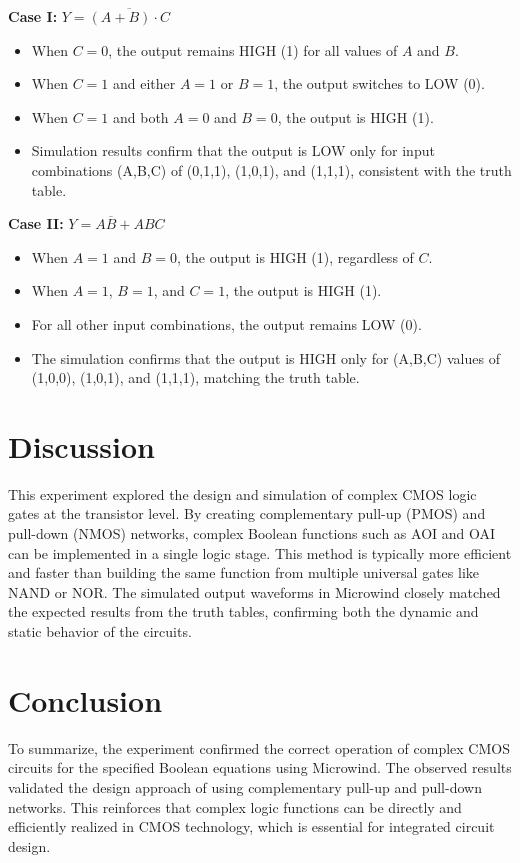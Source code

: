\documentclass[12pt]{article}
\begin{document}
\textbf{Case I:} \( Y = \overline{(A + B) \cdot C} \)
\begin{itemize}
  \item When \( C = 0 \), the output remains HIGH (1) for all values of \( A \) and \( B \).
  \item When \( C = 1 \) and either \( A = 1 \) or \( B = 1 \), the output switches to LOW (0).
  \item When \( C = 1 \) and both \( A = 0 \) and \( B = 0 \), the output is HIGH (1).
  \item Simulation results confirm that the output is LOW only for input combinations (A,B,C) of (0,1,1), (1,0,1), and (1,1,1), consistent with the truth table.
\end{itemize}

\textbf{Case II:} \( Y = A\overline{B} + ABC \)
\begin{itemize}
  \item When \( A = 1 \) and \( B = 0 \), the output is HIGH (1), regardless of \( C \).
  \item When \( A = 1 \), \( B = 1 \), and \( C = 1 \), the output is HIGH (1).
  \item For all other input combinations, the output remains LOW (0).
  \item The simulation confirms that the output is HIGH only for (A,B,C) values of (1,0,0), (1,0,1), and (1,1,1), matching the truth table.
\end{itemize}

\section*{Discussion}
This experiment explored the design and simulation of complex CMOS logic gates at the transistor level. By creating complementary pull-up (PMOS) and pull-down (NMOS) networks, complex Boolean functions such as AOI and OAI can be implemented in a single logic stage. This method is typically more efficient and faster than building the same function from multiple universal gates like NAND or NOR. The simulated output waveforms in Microwind closely matched the expected results from the truth tables, confirming both the dynamic and static behavior of the circuits.

\section*{Conclusion}
To summarize, the experiment confirmed the correct operation of complex CMOS circuits for the specified Boolean equations using Microwind. The observed results validated the design approach of using complementary pull-up and pull-down networks. This reinforces that complex logic functions can be directly and efficiently realized in CMOS technology, which is essential for integrated circuit design.



\renewcommand{\bibname}{References}

\end{document}
